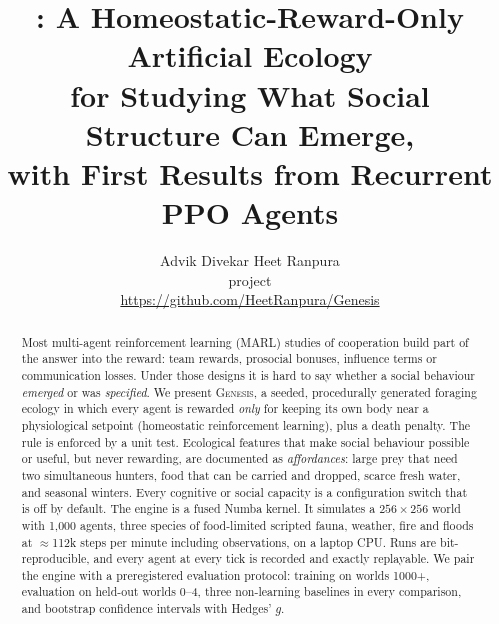 \documentclass[10pt]{article}
\title{\bfseries \genesis{}: A Homeostatic-Reward-Only Artificial Ecology\\for Studying What Social Structure Can Emerge,\\with First Results from Recurrent PPO Agents}
\author{%
  Advik Divekar \qquad Heet Ranpura\\[2pt]
  \small \genesis{} project\\
  \small \url{https://github.com/HeetRanpura/Genesis}
}
\date{}
\newcommand{\genesis}{\textsc{Genesis}}
\begin{document}
\maketitle
\thispagestyle{first}

\begin{abstract}
Most multi-agent reinforcement learning (MARL) studies of cooperation build part of the answer into the reward:
team rewards, prosocial bonuses, influence terms or communication losses. Under those designs it is hard to say
whether a social behaviour \emph{emerged} or was \emph{specified}. We present \genesis{}, a seeded, procedurally
generated foraging ecology in which every agent is rewarded \emph{only} for keeping its own body near a physiological
setpoint (homeostatic reinforcement learning), plus a death penalty. The rule is enforced by a unit test. Ecological
features that make social behaviour possible or useful, but never rewarding, are documented as \emph{affordances}:
large prey that need two simultaneous hunters, food that can be carried and dropped, scarce fresh water, and seasonal
winters. Every cognitive or social capacity is a configuration switch that is off by default. The engine is a fused
Numba kernel. It simulates a $256\times256$ world with 1{,}000 agents, three species of food-limited scripted fauna,
weather, fire and floods at $\approx$112k steps per minute including observations, on a laptop CPU. Runs are
bit-reproducible, and every agent at every tick is recorded and exactly replayable. We pair the engine with a
preregistered evaluation protocol: training on worlds 1000+, evaluation on held-out worlds 0--4, three non-learning
baselines in every comparison, and bootstrap confidence intervals with Hedges' $g$.


\end{abstract}
\end{document}
